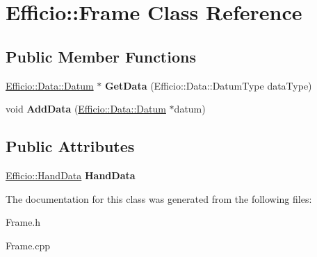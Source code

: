 \hypertarget{class_efficio_1_1_frame}{}\section{Efficio\+:\+:Frame Class Reference}
\label{class_efficio_1_1_frame}
\subsection*{Public Member Functions}
\begin{DoxyCompactItemize}
\item 
\hyperlink{class_efficio_1_1_data_1_1_datum}{Efficio\+::\+Data\+::\+Datum} $\ast$ {\bfseries Get\+Data} (Efficio\+::\+Data\+::\+Datum\+Type data\+Type)\hypertarget{class_efficio_1_1_frame_a8e93ddb6f0dd2b69d56536f673bbc29c}{}\label{class_efficio_1_1_frame_a8e93ddb6f0dd2b69d56536f673bbc29c}

\item 
void {\bfseries Add\+Data} (\hyperlink{class_efficio_1_1_data_1_1_datum}{Efficio\+::\+Data\+::\+Datum} $\ast$datum)\hypertarget{class_efficio_1_1_frame_a75ccb8867d8acfe698073a67f33f72d4}{}\label{class_efficio_1_1_frame_a75ccb8867d8acfe698073a67f33f72d4}

\end{DoxyCompactItemize}
\subsection*{Public Attributes}
\begin{DoxyCompactItemize}
\item 
\hyperlink{class_efficio_1_1_hand_data}{Efficio\+::\+Hand\+Data} {\bfseries Hand\+Data}\hypertarget{class_efficio_1_1_frame_a546f841f8294491f08c83ef16e5b421c}{}\label{class_efficio_1_1_frame_a546f841f8294491f08c83ef16e5b421c}

\end{DoxyCompactItemize}


The documentation for this class was generated from the following files\+:\begin{DoxyCompactItemize}
\item 
Frame.\+h\item 
Frame.\+cpp\end{DoxyCompactItemize}
